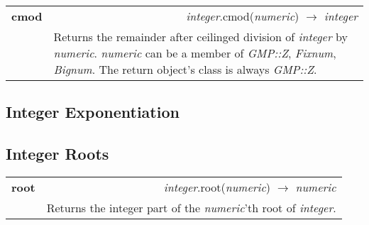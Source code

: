 \documentclass[pdftex,10pt]{article}
\newlength{\methwidth}
\newlength{\defnwidth}
\begin{document}
\begin{tabular}{p{\methwidth} l r}
\toprule
\textbf{cmod} & & \textit{integer}.cmod(\textit{numeric}) $\rightarrow$ \textit{integer}\\
\cmidrule(r){2-3}
& \multicolumn{2}{p{\defnwidth}}{
  Returns the remainder after ceilinged division of \textit{integer} by \textit{numeric}.
  \textit{numeric} can be a member of \textit{GMP::Z}, \textit{Fixnum}, \textit{Bignum}.
  The return object's class is always \textit{GMP::Z}.
}
\end{tabular}

\subsection{Integer Exponentiation}

\subsection{Integer Roots}

\begin{tabular}{p{\methwidth} l r}
\toprule
\textbf{root} & & \textit{integer}.root(\textit{numeric}) $\rightarrow$ \textit{numeric} \\
\cmidrule(r){2-3}
& \multicolumn{2}{p{\defnwidth}}{
  Returns the integer part of the \textit{numeric}'th root of \textit{integer}.
}
\end{tabular}
\end{document}
